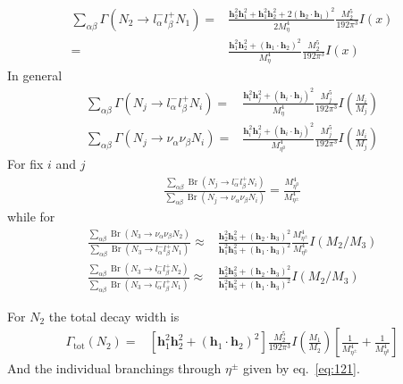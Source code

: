 \begin{align}
  \sum_{\alpha\beta}\Gamma(N_2\to l_\alpha^- l_\beta^+ N_1)=&\frac{\mathbf{h}_2^2\mathbf{h}_1^2+\mathbf{h}_1^2\mathbf{h}_2^2
    +2(\mathbf{h}_2\cdot\mathbf{h}_1)^2}{2 M_\eta^4}
  \frac{M_2^5}{192 \pi^3}I\left(x\right)\nonumber\\
=&\frac{\mathbf{h}_1^2\mathbf{h}_2^2
    +(\mathbf{h}_1\cdot\mathbf{h}_2)^2}{M_\eta^4}
  \frac{M_2^5}{192 \pi^3}{}I\left(x\right)
 \end{align}
In general
\begin{align}
  \label{eq:123}
    \sum_{\alpha\beta}\Gamma(N_j\to l_\alpha^- l_\beta^+ N_i)
=&\frac{\mathbf{h}_i^2\mathbf{h}_j^2
    +(\mathbf{h}_i\cdot\mathbf{h}_j)^2}{M_\eta^4}
  \frac{M_j^5}{192 \pi^3}{}I\left(\frac{M_i}{M_j}\right)\nonumber\\
    \sum_{\alpha\beta}\Gamma(N_j\to \nu_\alpha \nu_\beta N_i)
=&\frac{\mathbf{h}_i^2\mathbf{h}_j^2
    +(\mathbf{h}_i\cdot\mathbf{h}_j)^2}{M_{\eta^0}^4}
  \frac{M_j^5}{192 \pi^3}{}I\left(\frac{M_i}{M_j}\right)
\end{align}
For fix $i$ and $j$
\begin{align}
  \label{eq:124}
  \frac{\sum_{\alpha\beta}\operatorname{Br}(N_j\to l_\alpha^- l_\beta^+ N_i)}{\sum_{\alpha\beta}\operatorname{Br}(N_j\to \nu_\alpha \nu_\beta N_i)}=
\frac{M_{\eta^0}^4}{M_{\eta^\pm}^4}
\end{align}
while for 
\begin{align}
  \label{eq:125}
  \frac{\sum_{\alpha\beta}\operatorname{Br}(N_3\to\nu_\alpha\nu_\beta N_2)}{\sum_{\alpha\beta}\operatorname{Br}(N_3\to l_\alpha^-l_\beta^+ N_1)}\approx&
  \frac{\mathbf{h}_2^2\mathbf{h}_3^2
    +(\mathbf{h}_2\cdot\mathbf{h}_3)^2}{\mathbf{h}_1^2\mathbf{h}_3^2
    +(\mathbf{h}_1\cdot\mathbf{h}_3)^2}\frac{M_{\eta^\pm}^4}{M_{\eta^0}^4}I(M_2/M_3)\nonumber\\
  \frac{\sum_{\alpha\beta}\operatorname{Br}(N_3\to l_\alpha^-l_\beta^+ N_2)}{\sum_{\alpha\beta}\operatorname{Br}(N_3\to l_\alpha^-l_\beta^+ N_1)}\approx&
  \frac{\mathbf{h}_2^2\mathbf{h}_3^2
    +(\mathbf{h}_2\cdot\mathbf{h}_3)^2}{\mathbf{h}_1^2\mathbf{h}_3^2
    +(\mathbf{h}_1\cdot\mathbf{h}_3)^2}I(M_2/M_3)
\end{align}

For $N_2$ the total decay width is
\begin{align}
  \Gamma_{\text{tot}}(N_2)=&\left[{\mathbf{h}_1^2\mathbf{h}_2^2
    +(\mathbf{h}_1\cdot\mathbf{h}_2)^2}\right]
  \frac{M_2^5}{192 \pi^3}I\left(\frac{M_1}{M_2}\right)\left[\frac{1}{M_{\eta^\pm}^4}+\frac{1}{M_{\eta^0}^4}\right]
\end{align}
And the individual branchings through $\eta^\pm$ given by eq.~\eqref{eq:121}.


